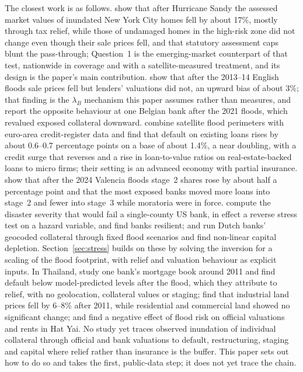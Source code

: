 The closest work is as follows. \citet{guo2026rising} show that after Hurricane Sandy the assessed market values of inundated New York City homes fell by about 17\%, mostly through tax relief, while those of undamaged homes in the high-risk zone did not change even though their sale prices fell, and that statutory assessment caps blunt the pass-through; Question~1 is the emerging-market counterpart of that test, nationwide in coverage and with a satellite-measured treatment, and its design is the paper's main contribution. \citet{garbarino2021high} show that after the 2013--14 English floods sale prices fell but lenders' valuations did not, an upward bias of about 3\%; that finding is the $\lambda_B$ mechanism this paper assumes rather than measures, and \citet{vangerwen2025flooded} report the opposite behaviour at one Belgian bank after the 2021 floods, which revalued exposed collateral downward. \citet{albertazzi2026physical} combine satellite flood perimeters with euro-area credit-register data and find that default on existing loans rises by about 0.6--0.7 percentage points on a base of about 1.4\%, a near doubling, with a credit surge that reverses and a rise in loan-to-value ratios on real-estate-backed loans to micro firms; their setting is an advanced economy with partial insurance. \citet{perezmontes2025impact} show that after the 2024 Valencia floods stage~2 shares rose by about half a percentage point and that the most exposed banks moved more loans into stage~2 and fewer into stage~3 while moratoria were in force. \citet{blickle2025bad} compute the disaster severity that would fail a single-county US bank, in effect a reverse stress test on a hazard variable, and find banks resilient; \citet{caloia2021flood} and \citet{caloia2026floods} run Dutch banks' geocoded collateral through fixed flood scenarios and find non-linear capital depletion. Section~\ref{sec:stress} builds on these by solving the inversion for a scaling of the flood footprint, with relief and valuation behaviour as explicit inputs. In Thailand, \citet{chitchumnong2025physical} study one bank's mortgage book around 2011 and find default below model-predicted levels after the flood, which they attribute to relief, with no geolocation, collateral values or staging; \citet{sawada2018land} find that industrial land prices fell by 6--8\% after 2011, while residential and commercial land showed no significant change; and \citet{chongwilaikasaem2022flood} find a negative effect of flood risk on official valuations and rents in Hat Yai. No study yet traces observed inundation of individual collateral through official and bank valuations to default, restructuring, staging and capital where relief rather than insurance is the buffer. This paper sets out how to do so and takes the first, public-data step; it does not yet trace the chain.

